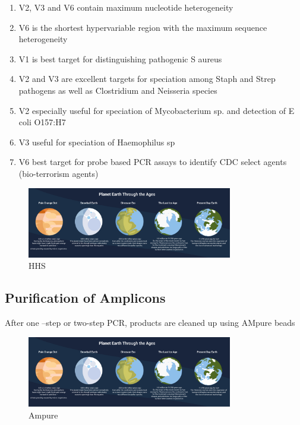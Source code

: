 \documentclass[
]{book}
\providecommand{\tightlist}{%
  \setlength{\itemsep}{0pt}\setlength{\parskip}{0pt}}
\begin{document}
\begin{enumerate}
\def\labelenumi{\arabic{enumi}.}
\tightlist
\item
  V2, V3 and V6 contain maximum nucleotide heterogeneity
\item
  V6 is the shortest hypervariable region
  with the maximum sequence
  heterogeneity
\item
  V1 is best target for distinguishing
  pathogenic S aureus
\item
  V2 and V3 are excellent targets for
  speciation among Staph and Strep pathogens as well as Clostridium and Neisseria species
\item
  V2 especially useful for speciation of Mycobacterium sp. and detection of E coli O157:H7
\item
  V3 useful for speciation of
  Haemophilus sp
\item
  V6 best target for probe based PCR assays to identify CDC select agents (bio-terrorism agents)
\end{enumerate}

\begin{figure}
\centering
\includegraphics[width=0.8\textwidth,height=\textheight]{./Figures/Planets.png}
\caption{HHS}
\end{figure}

\hypertarget{purification-of-amplicons}{%
\subsection{Purification of Amplicons}\label{purification-of-amplicons}}

After one --step or two-step PCR, products are cleaned up using AMpure beads

\begin{figure}
\centering
\includegraphics[width=0.8\textwidth,height=\textheight]{./Figures/Planets.png}
\caption{Ampure}
\end{figure}
\end{document}
